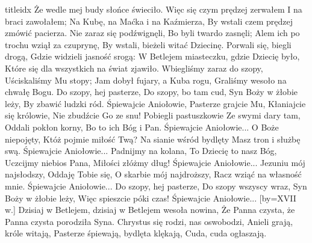 \documentclass[a5paper, portrait, 12pt]{mwart}
\begin{document}
\begin{songs}{titleidx}
      Że wedle mej budy słońce świeciło.
  \endchorus
\beginverse
    Więc się czym prędzej zerwałem
    I na braci zawołałem;
\endverse 
  \beginchorus
      Na Kubę, na Maćka i na Kaźmierza,
      By wstali czem prędzej zmówić pacierza.
  \endchorus
\beginverse
    Nie zaraz się podźwignęli,
    Bo byli twardo zasnęli;
\endverse 
  \beginchorus
      Alem ich po trochu wziął za czuprynę,
      By wstali, bieżeli witać Dziecinę.
  \endchorus
\beginverse
    Porwali się, biegli drogą,
    Gdzie widzieli jasność srogą:
\endverse 
  \beginchorus
      W Betlejem miasteczku, gdzie Dziecię było,
      Które się dla wszystkich na świat zjawiło.
  \endchorus
\beginverse
    Wbiegliśmy zaraz do szopy,
    Uściskaliśmy Mu stopy;
\endverse
  \beginchorus
      Jam dobył fujary, a Kuba rogu,
      Graliśmy wesoło na chwałę Bogu.
  \endchorus
\endsong
\beginverse
    Do szopy, hej pasterze,
    Do szopy, bo tam cud,
    Syn Boży w żłobie leży,
    By zbawić ludzki ród.
\endverse 
\beginchorus
        Śpiewajcie Aniołowie,
        Pasterze grajcie Mu,
        Kłaniajcie się królowie,
        Nie zbudźcie Go ze snu!
\endchorus
\beginverse
    Pobiegli pastuszkowie
    Ze swymi dary tam,
    Oddali pokłon korny,
    Bo to ich Bóg i Pan.
\endverse
\beginchorus
        Śpiewajcie Aniołowie...
\endchorus
\beginverse
    O Boże niepojęty,
    Któż pojmie miłość Twą?
    Na sianie wśród bydlęty
    Masz tron i służbę swą.
\endverse
\beginchorus
        Śpiewajcie Aniołowie...
\endchorus
\beginverse
    Padnijmy na kolana,
    To Dziecię to nasz Bóg,
    Uczcijmy niebios Pana,
    Miłości złóżmy dług!
\endverse
\beginchorus
        Śpiewajcie Aniołowie...
\endchorus
\beginverse
    Jezuniu mój najsłodszy,
    Oddaję Tobie się,
    O skarbie mój najdroższy,
    Racz wziąć na własność mnie.
\endverse
\beginchorus
        Śpiewajcie Aniołowie...
\endchorus
\beginverse
    Do szopy, hej pasterze,
    Do szopy wszyscy wraz,
    Syn Boży w żłobie leży,
    Więc spieszcie póki czas!
\endverse
\beginchorus
        Śpiewajcie Aniołowie...
\endchorus
\endsong
[by={XVII w.}]
\beginverse
    Dzisiaj w Betlejem, dzisiaj w Betlejem wesoła nowina,
    Że Panna czysta, że Panna czysta porodziła Syna.
\endverse 
\beginchorus
    Chrystus się rodzi, nas oswobodzi,
    Anieli grają, króle witają,
    Pasterze śpiewają, bydlęta klękają,
    Cuda, cuda ogłaszają.
\endchorus

\end{songs}
\end{document}
